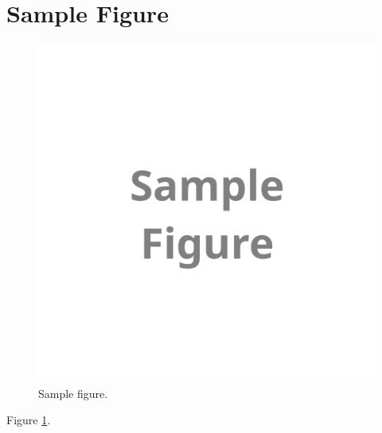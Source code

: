 
\section{Sample Figure}
\label{sec_SampleFig_ch_AdditionalMaterials}

\begin{figure}[!htb]
\includegraphics[width=\hsize]{./figures/fig_sample.png}
\caption{Sample figure.}
\label{fig_sample}
\end{figure}

Figure \ref{fig_sample}.
